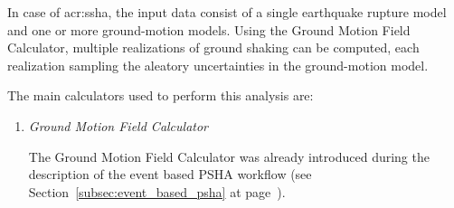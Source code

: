 In case of \gls{acr:ssha}, the input data consist of a single earthquake
rupture model and one or more ground-motion models. Using the Ground Motion
Field Calculator, multiple realizations of ground shaking can be computed,
each realization sampling the aleatory uncertainties in the ground-motion
model.

The main calculators used to perform this analysis are:

\begin{enumerate}

    \item \emph{Ground Motion Field Calculator}

    The Ground Motion Field Calculator was already introduced during the
	description of the event based PSHA workflow (see
	Section~\ref{subsec:event_based_psha} at
	page~\pageref{subsec:event_based_psha}).

\end{enumerate}